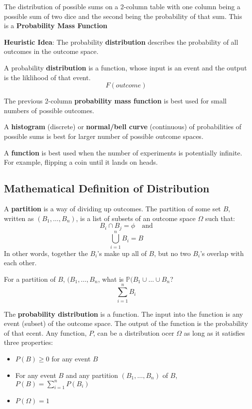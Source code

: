 \documentclass[titlepage, 12pt, leqno]{article}
\begin{document}
The distribution of possible sums on a 2-column table with one column being a possible sum of two dice and the second being the probability of that sum. This is a \textbf{Probability Mass Function} 

\textbf{Heuristic Idea}: 
The probability \textbf{distribution} describes the probability of all outcomes in the outcome space.

\begin{definition}
    A probability \textbf{distribution} is a function, whose input is an event and the output is the liklihood of that event.
    \[
    F(outcome)
    \]
\end{definition}

The previous 2-column \textbf{probability mass function} is best used for small numbers of possible outcomes.

A \textbf{histogram} (discrete) or \textbf{normal/bell curve} (continuous) of probabilities of possible sums is best for larger number of possible outcome spaces.

A \textbf{function} is best used  when the number of experiments is potentially infinite. For example, flipping a coin until it lands on heads.

\subsection{Mathematical Definition of Distribution}
\begin{definition}
    A \textbf{partition} is a way of dividing up outcomes. The partition of some set $B$, written as $(B_1,\dots,B_n)$, is a list of subsets of an outcome space $\Omega$ such that:
    \[
    B_i \cap B_j = \phi \quad \text{and}
    \]
    \[
    \bigcup_{i=1}^{n}B_i = B
    \]
   In other words, together the $B_i$'s make up all of $B$, but no two $B_i$'s overlap with each other.
\end{definition}

\begin{ex}
    For a partition of $B$, $(B_1, \dots, B_n$, what is $\mathbb{P}(B_1 \cup \dots \cup B_n$?
\[
    \boxed{\sum_{i=1}^{n}B_i} 
\]
\end{ex}

The \textbf{probability distribution} is a function. The input into the function is any event (subset) of the outcome space. The output of the function is the probability of that ecent. Any function, $P$, can be a distribution ocer $\Omega$ as long as it satisfies three properties:
\begin{itemize}
    \item $P(B) \ge 0$ for any event $B$ 
    \item For any event $B$ and any partition $(B_1, \dots, B_n)$ of $B$, $P(B) = \sum_{i=1}^{n}P(B_i)$ 
    \item $P(\Omega) = 1$ 
\end{itemize}
\end{document}
